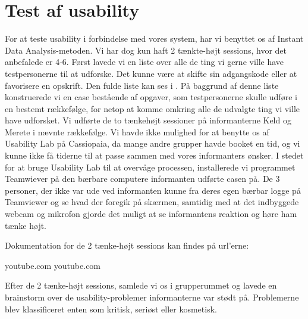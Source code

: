 \section{Test af usability}
\label{sec:usability}

For at teste usability i forbindelse med vores system, har vi benyttet os af Instant Data Analysis-metoden\cite{debida}. Vi har dog kun haft 2 tænkte-højt sessions, hvor det anbefalede er 4-6. Først lavede vi en liste over alle de ting vi gerne ville have testpersonerne til at udforske. Det kunne \fx være at skifte sin adgangskode eller at favorisere en opskrift. Den fulde liste kan ses i . På baggrund af denne liste konstruerede vi en case bestående af opgaver, som testpersonerne skulle udføre i en bestemt rækkefølge, for netop at komme omkring alle de udvalgte ting vi ville have udforsket. Vi udførte de to tænkehøjt sessioner på informanterne Keld og Merete i nævnte rækkefølge. Vi havde ikke mulighed for at benytte os af Usability Lab på Cassiopaia, da mange andre grupper havde booket en tid, og vi kunne ikke få tiderne til at passe sammen med vores informanters ønsker. I stedet for at bruge Usability Lab til at overvåge processen, installerede vi programmet Teamwiever på den bærbare computere informanten udførte casen på. De 3 personer, der ikke var ude ved informanten kunne fra deres egen bærbar logge på Teamviewer og se hvad der foregik på skærmen, samtidig med at det indbyggede webcam og mikrofon gjorde det muligt at se informantens reaktion og høre ham tænke højt.

Dokumentation for de 2 tænke-højt sessions kan findes på url'erne:
\begin{url}
youtube.com
youtube.com
\end{url}

Efter de 2 tænke-højt sessions, samlede vi os i grupperummet og lavede en brainstorm over de usability-problemer informanterne var stødt på. Problemerne blev klassificeret enten som kritisk, seriøst eller kosmetisk.

